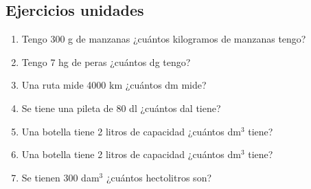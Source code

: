 \newpage
\subsection*{Ejercicios unidades}

\begin{enumerate}
\item Tengo 300 g de manzanas ¿cuántos kilogramos de manzanas tengo?

\item Tengo 7 hg de peras ¿cuántos dg tengo?

\item Una ruta mide 4000 km ¿cuántos dm mide?

\item Se tiene una pileta de 80 dl ¿cuántos dal tiene?

\item Una botella tiene 2 litros de capacidad ¿cuántos dm$^3$ tiene?

\item Una botella tiene 2 litros de capacidad ¿cuántos dm$^3$ tiene?

\item Se tienen 300 dam$^3$ ¿cuántos hectolitros son?
\end{enumerate}


